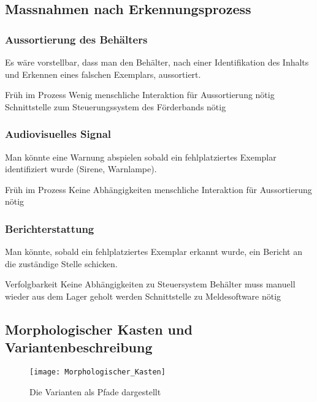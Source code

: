 \subsection{Massnahmen nach Erkennungsprozess}

\subsubsection{Aussortierung des Behälters}
Es wäre vorstellbar, dass man den Behälter, nach einer Identifikation des Inhalts und Erkennen eines falschen Exemplars, aussortiert.
\begin{itemize}
	\pro Früh im Prozess
	\pro Wenig menschliche Interaktion für Aussortierung nötig
	\con Schnittstelle zum Steuerungssystem des Förderbands nötig
\end{itemize}

\subsubsection{Audiovisuelles Signal}
Man könnte eine Warnung abspielen sobald ein fehlplatziertes Exemplar identifiziert wurde (Sirene, Warnlampe).
\begin{itemize}
	\pro Früh im Prozess
	\pro Keine Abhängigkeiten
	\con menschliche Interaktion für Aussortierung nötig
\end{itemize}

\subsubsection{Berichterstattung}
Man könnte, sobald ein fehlplatziertes Exemplar erkannt wurde, ein Bericht an die zuständige Stelle schicken.
\begin{itemize}
	\pro Verfolgbarkeit
	\pro Keine Abhängigkeiten zu Steuersystem
	\con Behälter muss manuell wieder aus dem Lager geholt werden
	\con Schnittstelle zu Meldesoftware nötig
\end{itemize}

\newpage

\subsection{Morphologischer Kasten und Variantenbeschreibung}

\begin{figure}[h!]
	\texttt{[image: Morphologischer\_Kasten]}
	\caption{Die Varianten als Pfade dargestellt}
	\label{fig:MorphKasten}
\end{figure}

